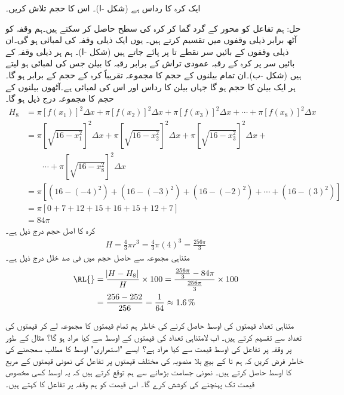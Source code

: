 ایک کرہ کا رداس  ہے (شکل -ا)۔ اس کا حجم تلاش کریں۔

حل:\quad
ہم تفاعل  کو  محور کے گرد گما کر کرہ کی سطح حاصل کر سکتے ہیں۔ہم وقفہ  کو آٹھ برابر ذیلی وقفوں میں تقسیم کرتے ہیں۔ یوں ایک ذیلی وقفہ کی لمبائی  ہو گی۔ان ذیلی وقفوں کے بائیں سر نقطے  تا  پر پائے جاتے ہیں (شکل -ا)۔ ہم ہر ذیلی وقفہ  کے بائیں سر پر کرہ کے رقبہ عمودی تراش کے برابر رقبہ کا بیلن جس کی لمبائی  ہو لیتے ہیں (شکل -ب)۔ان تمام بیلنوں  کے حجم کا مجموعہ تقریباً کرہ کے حجم کے برابر ہو گا۔ ہر ایک بیلن کا حجم  ہو گا جہاں بیلن کا رداس  اور اس کی لمبائی  ہے۔آٹھوں بیلنوں کے حجم کا مجموعہ درج ذیل ہو گا۔
\begin{align*}
H_8&=\pi[f(x_1)]^2\Delta x+\pi[f(x_2)]^2\Delta x+\pi[f(x_3)]^2\Delta x+\cdots+\pi[f(x_8)]^2\Delta x\\
&=\pi\left[\sqrt{16-x_1^2}\right]^2\Delta x+\pi\left[\sqrt{16-x_2^2}\right]^2\Delta x+\pi\left[\sqrt{16-x_3^2}\right]^2\Delta x+\\
&\quad\quad\cdots+\pi\left[\sqrt{16-x_8^2}\right]^2\Delta x\\
&=\pi[(16-(-4)^2)+(16-(-3)^2)+(16-(-2)^2)+\cdots+(16-(3)^2)]\\
&=\pi[0+7+12+15+16+15+12+7]\\
&=84\pi
\end{align*}
کرہ کا اصل حجم درج ذیل ہے۔
\begin{align*}
H=\frac{4}{3}\pi r^3=\frac{4}{3}\pi (4)^3=\frac{256\pi}{3}
\end{align*}
متناہی مجموعہ سے حاصل حجم میں فی صد خلل درج ذیل ہے۔
\begin{align*}
\text{\RL{}}&=\frac{\abs{H-H_8}}{H}\times 100=\frac{\tfrac{256\pi}{3}-84\pi}{\tfrac{256\pi}{3}}\times 100\\
&=\frac{256-252}{256}=\frac{1}{64}\approx \SI{1.6}{\percent}
\end{align*}

متناہی تعداد قیمتوں کی اوسط حاصل کرنے کی خاطر ہم تمام قیمتوں کا مجموعہ لے کر قیمتوں کی تعداد سے تقسیم کرتے ہیں۔ اب لامتناہی تعداد کی قیمتوں کے اوسط سے کیا مراد ہو گا؟ مثال کے طور پر وقفہ  پر تفاعل  کی اوسط قیمت سے کیا مراد ہے؟  ایسے "استمراری" اوسط کا مطلب سمجھنے کی خاطر فرض کریں کہ ہم  تا  کے بیچ بلا منصوبہ   کی مختلف قیمتوں پر تفاعل کی نمونی قیمتوں کے مربع کا اوسط حاصل کرتے ہیں۔ نمونی جسامت بڑھانے سے ہم توقع کرتے ہیں کہ یہ اوسط کسی مخصوص قیمت تک پہنچنے کی کوشش کرے گا۔ اس قیمت کو ہم وقفہ  پر تفاعل کا  کہتے ہیں۔

